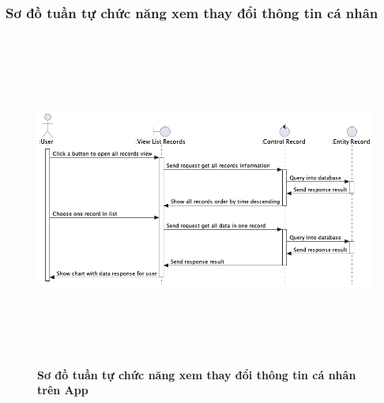 \documentclass{article}%
\begin{document}
\subsubsection{Sơ đồ tuần tự chức năng xem thay đổi thông tin cá nhân}
  \begin{figure}[H]
        \centering
        \includegraphics[width=16cm,height=11cm]{Images/mobile_app/view_record_timeline.png}
        \caption[Sơ đồ tuần tự chức năng xem thay đổi thông tin cá nhân trên App]{\bfseries \fontsize{12pt}{0pt}
        \selectfont Sơ đồ tuần tự chức năng xem thay đổi thông tin cá nhân trên App}
        \label{hinh21} %
  \end{figure}
\end{document}
